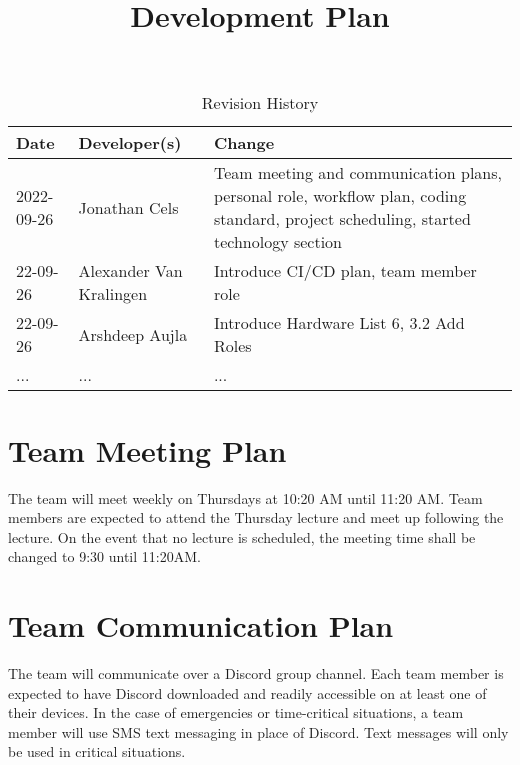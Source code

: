 \documentclass{article}
\title{Development Plan\\\progname}
\author{\authname}
\date{}
\begin{document}
\begin{table}[hp]
\caption{Revision History} \label{TblRevisionHistory}
\begin{tabularx}{\textwidth}{llX}
\toprule
\textbf{Date} & \textbf{Developer(s)} & \textbf{Change}\\
\midrule
2022-09-26 & Jonathan Cels & Team meeting and communication plans, personal role, workflow plan, coding standard, project scheduling, started technology section\\
22-09-26 & Alexander Van Kralingen & Introduce CI/CD plan, team member role\\
22-09-26 & Arshdeep Aujla & Introduce Hardware List 6, 3.2 Add Roles\\
... & ... & ...\\
\bottomrule
\end{tabularx}
\end{table}

\newpage

\maketitle


\section{Team Meeting Plan}
{The team will meet weekly on Thursdays at 10:20 AM until 11:20 AM. 
Team members are expected to attend the Thursday lecture and meet up following the lecture. 
On the event that no lecture is scheduled, the meeting time shall be changed to 9:30 until 11:20AM.}

\medskip
{}

\section{Team Communication Plan}
{The team will communicate over a Discord group channel. Each team member is expected to have Discord downloaded and readily accessible on at least one of their devices. 
In the case of emergencies or time-critical situations, a team member will use SMS text messaging in place of Discord. Text messages will only be used in critical situations.}

\medskip
{}
\end{document}
